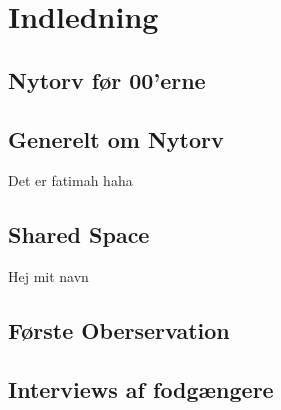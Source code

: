 \chapter{Indledning}
\label{chap:Indledning}

\section{Nytorv før 00'erne}
\label{sec:Nytorv før 00'erne}

\section{Generelt om Nytorv}
\label{sec:Generelt om Nytorv}
Det er fatimah haha
\section{Shared Space}
\label{sec:Shared Space}
Hej mit navn \cite {datasheet_pir1}
\section{Første Oberservation}
\label{sec:Første Oberservation}

\section{Interviews af fodgængere}
\label{sec:Interviews af fodgængere}
